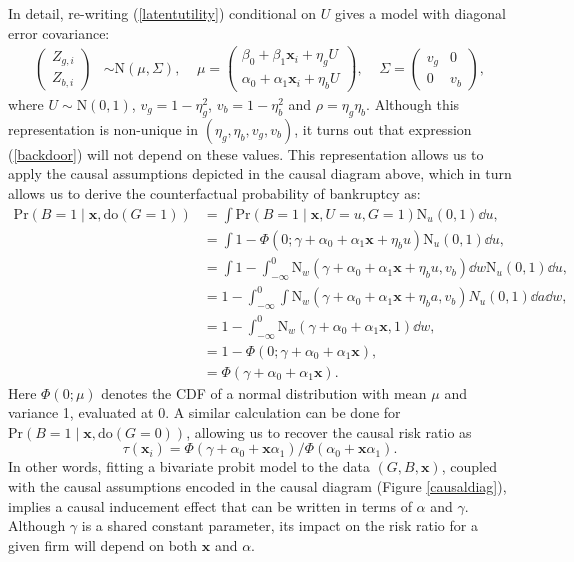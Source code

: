 \documentclass[aoas,preprint, 11pt, dvipsnames, table, x11name]{imsart}
\newcommand{\N}{\mbox{N}}
\theoremstyle{remark}
\begin{document}
In detail, re-writing (\ref{latentutility}) conditional on $U$ gives a model with diagonal error covariance:
\begin{equation}
\begin{split}
\begin{pmatrix}
Z_{g,i} \\ Z_{b,i}
\end{pmatrix} &\sim \mbox{N}(\mu, \Sigma), \;\;\;\; 
\mu  = \begin{pmatrix}
\beta_{0} + \beta_{1}\mathbf{x}_i + \eta_g U  \\
\alpha_{0} + \alpha_{1}\mathbf{x}_{i}  + \eta_b U
\end{pmatrix},  \;\;\;\;  \Sigma = \begin{pmatrix} v_g & 0 \\ 0 & v_b \end{pmatrix},
\end{split}
\end{equation}
where $U \sim \mbox{N}(0, 1)$, $v_g = 1 - \eta_g^2$, $v_b = 1 - \eta_b^2$ and $\rho = \eta_g \eta_b$.  Although this representation is non-unique in $(\eta_g, \eta_b, v_g, v_b)$, it turns out that expression (\ref{backdoor}) will not depend on these values.  This representation allows us to apply the causal assumptions depicted in the causal diagram above, which in turn allows us to derive the counterfactual probability of bankruptcy as:
\begin{equation}
\begin{split}
\mbox{Pr}(B = 1 \mid \mathbf{x}, \text{do}(G = 1)) &=  \int  \mbox{Pr}(B = 1 \mid \mathbf{x}, U=u, G = 1) \N_u(0,1) \dd u,\\
& = \int  1 - \Phi(0; \gamma + \alpha_0 + \alpha_1 \mathbf{x} + \eta_b u) \N_u(0,1) \dd u,\\
& = \int 1 - \int_{-\infty}^0 \N_w(\gamma + \alpha_0 + \alpha_1 \mathbf{x} + \eta_b u, v_b) \dd w \N_u(0,1) \dd u,\\
& = 1 - \int_{-\infty}^0 \int \N_w(\gamma + \alpha_0 + \alpha_1 \mathbf{x} + \eta_b a, v_b)  N_u(0,1) \dd a \dd w,\\
& = 1 - \int_{-\infty}^0 \N_w(\gamma + \alpha_0 + \alpha_1 \mathbf{x}, 1) \dd w,\\
& = 1 - \Phi(0; \gamma + \alpha_0 + \alpha_1 \mathbf{x}),\\ 
&= \Phi(\gamma + \alpha_0 + \alpha_1 \mathbf{x}).
\end{split}
\end{equation}
Here $\Phi(0; \mu)$ denotes the CDF of a normal distribution with mean $\mu$ and variance 1, evaluated at 0.  A similar calculation can be done for $\mbox{Pr}(B = 1 \mid \mathbf{x}, \text{do}(G = 0))$, allowing us to recover the causal risk ratio as $$\tau(\mathbf{x}_i) = \Phi(\gamma + \alpha_0 + \mathbf{x}\alpha_1) /\Phi(\alpha_0 + \mathbf{x}\alpha_1).$$  In other words, fitting a bivariate probit model to the data $(G, B, \mathbf{x})$, coupled with the causal assumptions encoded in the causal diagram (Figure \ref{causaldiag}), implies a causal inducement effect that can be written in terms of $\alpha$ and $\gamma$. Although $\gamma$ is a shared constant parameter, its impact on the risk ratio for a given firm will depend on both $\mathbf{x}$ and $\alpha$. 
\end{document}
